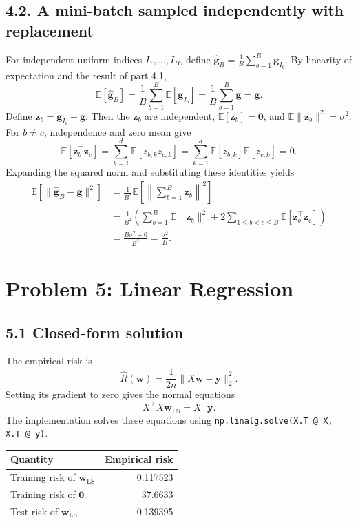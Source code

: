 \subsection*{4.2. A mini-batch sampled independently with replacement}
For independent uniform indices $I_1,\ldots,I_B$, define
$\widehat{\mathbf{g}}_B=\frac1B\sum_{b=1}^{B}\mathbf{g}_{I_b}$.
By linearity of expectation and the result of part 4.1,
\[
\boxed{\mathbb{E}[\widehat{\mathbf{g}}_B]
=\frac1B\sum_{b=1}^{B}\mathbb{E}[\mathbf{g}_{I_b}]
=\frac1B\sum_{b=1}^{B}\mathbf{g}=\mathbf{g}}.
\]
Define $\mathbf{z}_b=\mathbf{g}_{I_b}-\mathbf{g}$. Then the $\mathbf{z}_b$ are independent, $\mathbb{E}[\mathbf{z}_b]=\mathbf{0}$,
and $\mathbb{E}\|\mathbf{z}_b\|^2=\sigma^2$. For $b\ne c$, independence and zero mean give
\[
\mathbb{E}[\mathbf{z}_b^{\top}\mathbf{z}_c]
=\sum_{k=1}^{d}\mathbb{E}[z_{b,k}z_{c,k}]
=\sum_{k=1}^{d}\mathbb{E}[z_{b,k}]\mathbb{E}[z_{c,k}]=0.
\]
Expanding the squared norm and substituting these identities yields
\begin{align*}
\mathbb{E}\!\left[\|\widehat{\mathbf{g}}_B-\mathbf{g}\|^2\right]
&=\frac1{B^2}\mathbb{E}\!\left[\left\|\sum_{b=1}^{B}\mathbf{z}_b\right\|^2\right]\\
&=\frac1{B^2}\left(
  \sum_{b=1}^{B}\mathbb{E}\|\mathbf{z}_b\|^2
  +2\sum_{1\le b<c\le B}\mathbb{E}[\mathbf{z}_b^{\top}\mathbf{z}_c]
  \right)\\
&=\frac{B\sigma^2+0}{B^2}=\boxed{\frac{\sigma^2}{B}}.
\end{align*}

\clearpage

\section*{Problem 5: Linear Regression}

\subsection*{5.1 Closed-form solution}

The empirical risk is
\[
\widehat R(\mathbf w)
=\frac{1}{2n}\|X\mathbf w-\mathbf y\|_2^2.
\]
Setting its gradient to zero gives the normal equations
\[
X^\top X\mathbf w_{\mathrm{LS}}=X^\top\mathbf y.
\]
The implementation solves these equations using
\texttt{np.linalg.solve(X.T @ X, X.T @ y)}.

\begin{center}
\begin{tabular}{lr}
\toprule
Quantity & Empirical risk \\
\midrule
Training risk of $\mathbf w_{\mathrm{LS}}$ & 0.117523 \\
Training risk of $\mathbf 0$ & 37.6633 \\
Test risk of $\mathbf w_{\mathrm{LS}}$ & 0.139395 \\
\bottomrule
\end{tabular}
\end{center}

